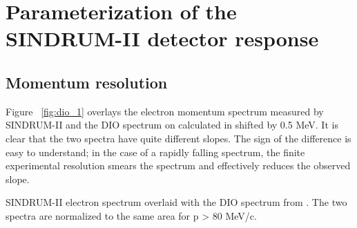 \newpage
\section {Parameterization of the SINDRUM-II detector response}

\subsection{Momentum resolution}

Figure ~\ref{fig:dio_1} overlays the electron momentum spectrum measured by SINDRUM-II
and the DIO spectrum on  calculated in \cite{Watanabe_1993} shifted by 0.5 MeV.
It is clear that the two spectra have quite different slopes.
The sign of the difference is easy to understand; in the case of a rapidly falling
spectrum, the finite experimental resolution smears the spectrum and effectively
reduces the observed slope. 

\vspace{0.2in}
 {
  \label{fig:dio_1}
  SINDRUM-II electron spectrum overlaid with the DIO spectrum from \cite{Watanabe_1993}.
  The two spectra are normalized to the same area for p > 80 MeV/c.
}
\vspace{0.2in}

